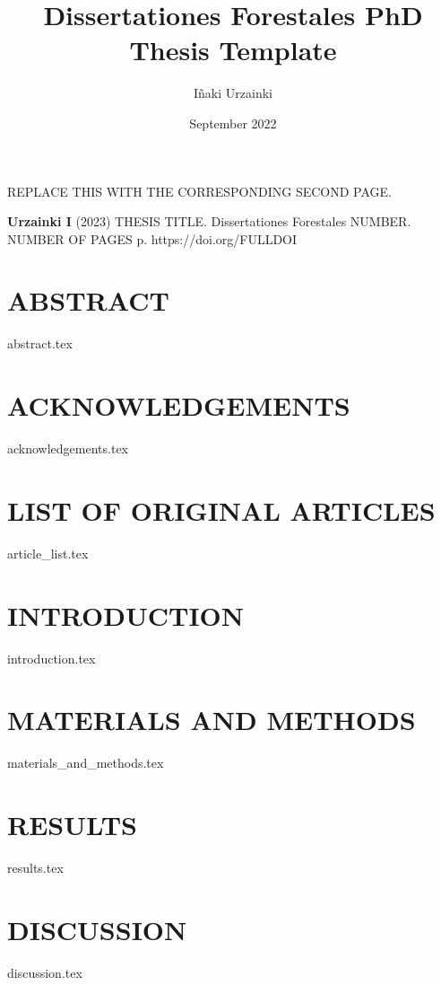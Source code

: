 \documentclass[b5paper, twoside, 10pt]{article}
\title{Dissertationes Forestales PhD Thesis Template}
\author{Iñaki Urzainki}
\date{September 2022}
\begin{document}
\maketitle
\newpage

REPLACE THIS WITH THE CORRESPONDING SECOND PAGE.
\newpage

\noindent \textbf{Urzainki I} (2023) THESIS TITLE. Dissertationes Forestales NUMBER. NUMBER OF PAGES p.
https://doi.org/FULLDOI
\section*{ABSTRACT}
{abstract.tex} 
\newpage

\section*{ACKNOWLEDGEMENTS}
{acknowledgements.tex} 
\newpage

\section*{LIST OF ORIGINAL ARTICLES}
{article_list.tex} 
\newpage

\tableofcontents
\newpage


\section{INTRODUCTION}
{introduction.tex} %

\section{MATERIALS AND METHODS}
{materials_and_methods.tex}


\section{RESULTS}
{results.tex}

\section{DISCUSSION}
{discussion.tex}
\newpage

\printbibliography[title = {REFERENCES}]
\end{document}
